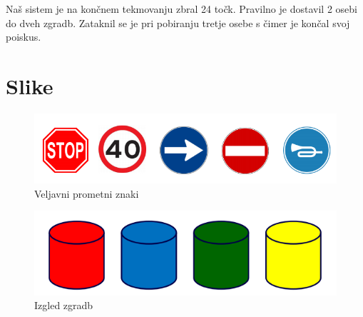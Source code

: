 \documentclass[a4paper,11pt]{article}
\begin{document}
Naš sistem je na končnem tekmovanju zbral 24 točk. Pravilno je dostavil 2 osebi do dveh zgradb. Zataknil se je pri pobiranju tretje osebe s čimer je končal svoj poiskus.

\pagebreak
\appendix
\appendixpage
\section{\label{sec:slike}Slike}
\begin{figure}[htbp]
\begin{center}
\includegraphics[width=\textwidth]{signs.png}
\caption{Veljavni prometni znaki}
\label{slika1}
\end{center}
\end{figure}

\begin{figure}[htbp]
\begin{center}
\includegraphics[width=\textwidth]{buildings.png}
\caption{Izgled zgradb}
\label{slika1}
\end{center}
\end{figure}
\end{document}
